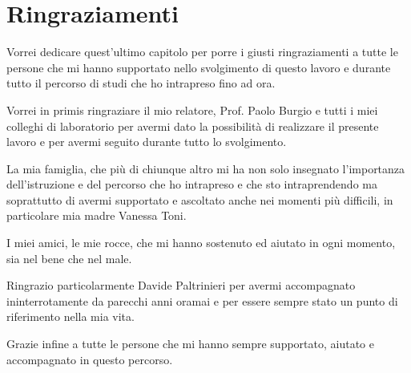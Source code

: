 \chapter{Ringraziamenti}
Vorrei dedicare quest'ultimo capitolo per porre i giusti ringraziamenti a tutte le persone che mi hanno supportato nello svolgimento di questo lavoro e durante tutto il percorso di studi che ho intrapreso fino ad ora.

\noindent Vorrei in primis ringraziare il mio relatore, Prof. Paolo Burgio e tutti i miei colleghi di laboratorio per avermi dato la possibilità di realizzare il presente lavoro e per avermi seguito durante tutto lo svolgimento.

\noindent La mia famiglia, che più di chiunque altro mi ha non solo insegnato l'importanza dell'istruzione e del percorso che ho intrapreso e che sto intraprendendo ma soprattutto di avermi supportato e ascoltato anche nei momenti più difficili, in particolare mia madre Vanessa Toni.

\noindent I miei amici, le mie rocce, che mi hanno sostenuto ed aiutato in ogni momento, sia nel bene che nel male.

\noindent Ringrazio particolarmente Davide Paltrinieri per avermi accompagnato ininterrotamente da parecchi anni oramai e per essere sempre stato un punto di riferimento nella mia vita.

\noindent Grazie infine a tutte le persone che mi hanno sempre supportato, aiutato e accompagnato in questo percorso. 
